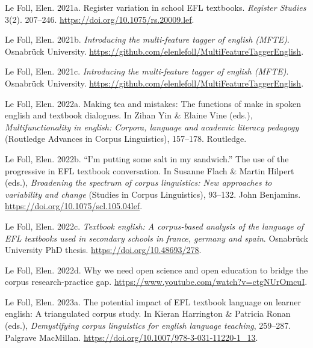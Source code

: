 \documentclass[
  letterpaper,
  DIV=11,
  numbers=noendperiod]{scrreprt}
\newlength{\cslhangindent}
\newenvironment{CSLReferences}[2] %
 {\begin{list}{}{%
  \setlength{\itemindent}{0pt}
  \setlength{\leftmargin}{0pt}
  \setlength{\parsep}{0pt}
  \ifodd #1
   \setlength{\leftmargin}{\cslhangindent}
   \setlength{\itemindent}{-1\cslhangindent}
  \fi
  \setlength{\itemsep}{#2\baselineskip}}}
 {\end{list}}
\begin{document}
\begin{CSLReferences}{1}{0}
Le Foll, Elen. 2021a. Register variation in school EFL textbooks.
\emph{Register Studies} 3(2). 207--246.
\url{https://doi.org/10.1075/rs.20009.lef}.

Le Foll, Elen. 2021b. \emph{Introducing the multi-feature tagger of
english (MFTE)}. Osnabrück University.
\url{https://github.com/elenlefoll/MultiFeatureTaggerEnglish}.

Le Foll, Elen. 2021c. \emph{Introducing the multi-feature tagger of
english (MFTE)}. Osnabrück University.
\url{https://github.com/elenlefoll/MultiFeatureTaggerEnglish}.

Le Foll, Elen. 2022a. Making tea and mistakes: The functions of make in
spoken english and textbook dialogues. In Zihan Yin \& Elaine Vine
(eds.), \emph{Multifunctionality in english: Corpora, language and
academic literacy pedagogy} (Routledge Advances in Corpus Linguistics),
157--178. Routledge.

Le Foll, Elen. 2022b. {``I'm putting some salt in my sandwich.''} The
use of the progressive in EFL textbook conversation. In Susanne Flach \&
Martin Hilpert (eds.), \emph{Broadening the spectrum of corpus
linguistics: New approaches to variability and change} (Studies in
Corpus Linguistics), 93--132. John Benjamins.
\url{https://doi.org/10.1075/scl.105.04lef}.

Le Foll, Elen. 2022c. \emph{Textbook english: A corpus-based analysis of
the language of EFL textbooks used in secondary schools in france,
germany and spain}. Osnabrück University PhD thesis.
\url{https://doi.org/10.48693/278}.

Le Foll, Elen. 2022d. Why we need open science and open education to
bridge the corpus research-practice gap.
\url{https://www.youtube.com/watch?v=ctgNUrOmcuI}.

Le Foll, Elen. 2023a. The potential impact of EFL textbook language on
learner english: A triangulated corpus study. In Kieran Harrington \&
Patricia Ronan (eds.), \emph{Demystifying corpus linguistics for english
language teaching}, 259--287. Palgrave MacMillan.
\url{https://doi.org/10.1007/978-3-031-11220-1_13}.


\end{CSLReferences}
\end{document}
